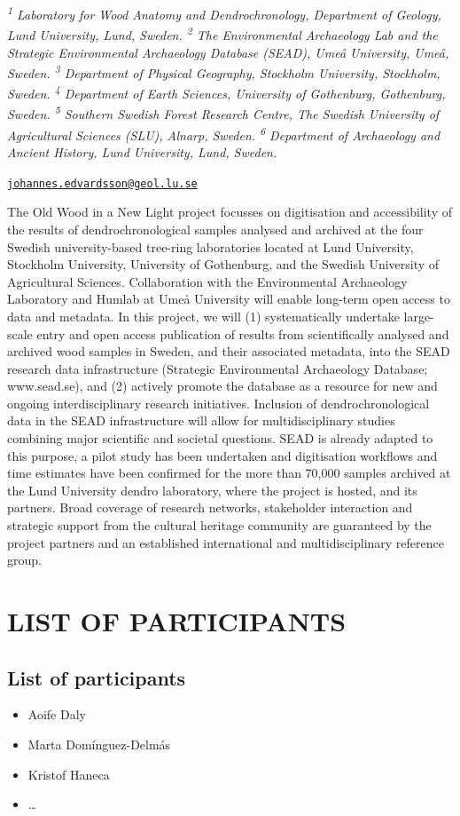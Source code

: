 \documentclass[
]{book}
\providecommand{\tightlist}{%
  \setlength{\itemsep}{0pt}\setlength{\parskip}{0pt}}
\begin{document}
\emph{\textsuperscript{1} Laboratory for Wood Anatomy and Dendrochronology, Department of Geology, Lund University, Lund, Sweden. \textsuperscript{2} The Environmental Archaeology Lab and the Strategic Environmental Archaeology Database (SEAD), Umeå University, Umeå, Sweden. \textsuperscript{3} Department of Physical Geography, Stockholm University, Stockholm, Sweden. \textsuperscript{4} Department of Earth Sciences, University of Gothenburg, Gothenburg, Sweden. \textsuperscript{5} Southern Swedish Forest Research Centre, The Swedish University of Agricultural Sciences (SLU), Alnarp, Sweden. \textsuperscript{6} Department of Archaeology and Ancient History, Lund University, Lund, Sweden.}

\href{mailto:johannes.edvardsson@geol.lu.se}{\nolinkurl{johannes.edvardsson@geol.lu.se}}

The Old Wood in a New Light project focusses on digitisation and accessibility of the results of dendrochronological samples analysed and archived at the four Swedish university-based tree-ring laboratories located at Lund University, Stockholm University, University of Gothenburg, and the Swedish University of Agricultural Sciences. Collaboration with the Environmental Archaeology Laboratory and Humlab at Umeå University will enable long-term open access to data and metadata. In this project, we will (1) systematically undertake large-scale entry and open access publication of results from scientifically analysed and archived wood samples in Sweden, and their associated metadata, into the SEAD research data infrastructure (Strategic Environmental Archaeology Database; www.sead.se), and (2) actively promote the database as a resource for new and ongoing interdisciplinary research initiatives. Inclusion of dendrochronological data in the SEAD infrastructure will allow for multidisciplinary studies combining major scientific and societal questions. SEAD is already adapted to this purpose, a pilot study has been undertaken and digitisation workflows and time estimates have been confirmed for the more than 70,000 samples archived at the Lund University dendro laboratory, where the project is hosted, and its partners. Broad coverage of research networks, stakeholder interaction and strategic support from the cultural heritage community are guaranteed by the project partners and an established international and multidisciplinary reference group.

\hypertarget{part-list-of-participants}{%
\part*{LIST OF PARTICIPANTS}\label{part-list-of-participants}}

\hypertarget{list-of-participants}{%
\chapter*{List of participants}\label{list-of-participants}}

\begin{itemize}
\tightlist
\item
  Aoife Daly
\item
  Marta Domínguez-Delmás
\item
  Kristof Haneca
\item
  \ldots{}
\end{itemize}
\end{document}
